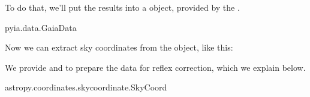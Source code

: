 \documentclass[letterpaper,10pt,english]{sphinxmanual}
\begin{document}
To do that, we’ll put the results into a  object, provided by the .

\begin{sphinxVerbatim}[commandchars=\\\{\}]
   

  
\end{sphinxVerbatim}

\begin{sphinxVerbatim}[commandchars=\\\{\}]
pyia.data.GaiaData
\end{sphinxVerbatim}

Now we can extract sky coordinates from the  object, like this:

\begin{sphinxVerbatim}[commandchars=\\\{\}]
   

  
\end{sphinxVerbatim}

We provide  and  to prepare the data for reflex correction, which we explain below.

\begin{sphinxVerbatim}[commandchars=\\\{\}]
\end{sphinxVerbatim}

\begin{sphinxVerbatim}[commandchars=\\\{\}]
astropy.coordinates.sky\PYGZus{}coordinate.SkyCoord
\end{sphinxVerbatim}
\end{document}
